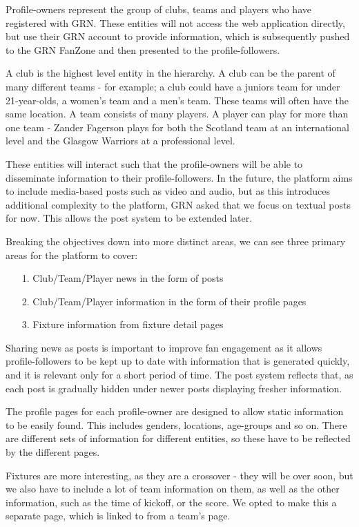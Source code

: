 \documentclass{l3proj}
\begin{document}
Profile-owners represent the group of clubs, teams and players who have registered with
 GRN. These entities will not access the web application directly, but use their GRN account
 to provide information, which is subsequently pushed to the GRN FanZone and then presented
 to the profile-followers.
 
A club is the highest level entity in the hierarchy. A club can be the parent of many different
 teams - for example; a club could have a juniors team for under 21-year-olds, a women's team and
 a men's team. These teams will often have the same location. A team consists of many players. A
 player can play for more than one team - Zander Fagerson plays for both the Scotland
 team at an international level and the Glasgow Warriors at a professional level.
 
These entities will interact such that the profile-owners will be able to disseminate
 information to their profile-followers. In the future, the platform aims to include 
 media-based posts such as video and audio, but as this introduces additional complexity
 to the platform, GRN asked that we focus on textual posts for now. This allows the post system
 to be extended later.

 
Breaking the objectives down into more distinct areas, we can see three primary areas for
 the platform to cover:

\begin{itemize}
\item[1.] Club/Team/Player news in the form of posts
\item[2.] Club/Team/Player information in the form of their profile pages
\item[3.] Fixture information from fixture detail pages 
\end{itemize}

Sharing news as posts is important to improve fan engagement as it allows
 profile-followers to be kept up to date with information that is generated quickly,
 and it is relevant only for a short period of time. The post system reflects 
 that, as each post is gradually hidden under newer posts displaying fresher 
 information.

The profile pages for each profile-owner are designed to allow static 
 information to be easily found. This includes genders, locations, age-groups and 
 so on. There are different sets of information for different entities, so these
 have to be reflected by the different pages.
 
Fixtures are more interesting, as they are a crossover - they will be over soon, 
 but we also have to include a lot of team information on them, as well as the
 other information, such as the time of kickoff, or the score. We opted to make 
 this a separate page, which is linked to from a team's page.
 
\end{document}
